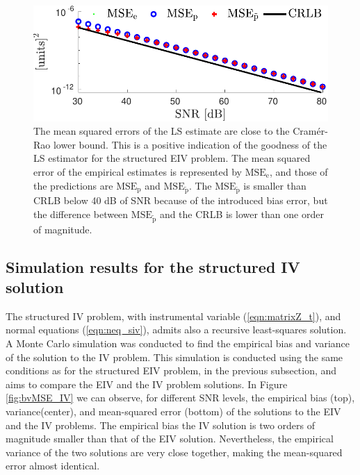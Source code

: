\begin{figure}[!htpb]
  \centering
  \includegraphics[width=0.69\columnwidth]{./ChapterStatisticalAnalysis/fig/Fig_11.pdf}
  \caption{\label{fig:MSE_CRLB}
The mean squared errors of the LS estimate are close to the Cram\'er-Rao lower bound. This is a positive indication of the goodness of the LS estimator for the structured EIV problem. The mean squared error of the empirical estimates is represented by $\mathrm{MSE}_{\mathrm{e}}$, and those of the predictions are $\mathrm{MSE}_{\mathrm{p}}$ and $\mathrm{MSE}_{\widetilde{\mathrm{p}}}$. The $\mathrm{MSE}_{\widetilde{\mathrm{p}}}$ is smaller than CRLB below 40 dB of SNR because of the introduced bias error, but the difference between $\mathrm{MSE}_{\widetilde{\mathrm{p}}}$ and the CRLB is lower than one order of magnitude.}
\end{figure}

\color{blue}
\subsection{Simulation results for the structured IV solution}

The structured IV problem, with instrumental variable (\ref{eqn:matrixZ_t}), and normal equations (\ref{eqn:neq_siv}), admits also a recursive least-squares solution. 
A Monte Carlo simulation was conducted to find the empirical bias and variance of the solution to the IV problem.
This simulation is conducted using the same conditions as for the structured EIV problem, in the previous subsection, and aims to compare the EIV and the IV problem solutions.   
In Figure \ref{fig:bvMSE_IV} we can observe, for different SNR levels, the empirical bias (top), variance(center), and mean-squared error (bottom) of the solutions to the EIV and the IV problems.
The empirical bias the IV solution is two orders of magnitude smaller than that of the EIV solution. 
Nevertheless, the empirical variance of the two solutions are very close together, making the mean-squared error almost identical.
 

